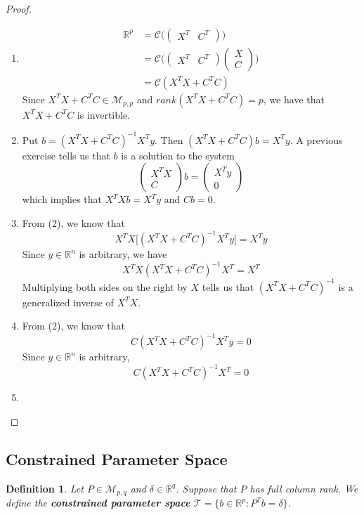 \documentclass[12pt]{amsart}
\newtheorem{defn}[thm]{Definition}
\newcommand{\del}{\delta}
\newcommand{\R}{\mathbb{R}}
\newcommand{\MC}{\mathcal{C}}
\newcommand{\MT}{\mathcal{T}}
\newcommand{\MM}{\mathcal{M}}
\begin{document}
\begin{proof}\
\begin{enumerate}
\item \begin{align*}
\R^p 
&= \MC\big(\begin{pmatrix}
X^T & C^T
\end{pmatrix}\big) \\
&= \MC\bigg(\begin{pmatrix}
X^T & C^T
\end{pmatrix} \begin{pmatrix}
X \\ C
\end{pmatrix}\bigg) \\
&= \MC(X^TX + C^TC)
\end{align*}
Since $X^TX + C^TC \in \MM_{p,p}$ and $rank(X^TX + C^TC) = p$, we have that $X^TX + C^TC$ is invertible.
\item Put $b = (X^TX +C^TC)^{-1}X^Ty$. Then $(X^TX +C^TC)b = X^Ty$. A previous exercise tells us that $b$ is a solution to the system $$\begin{pmatrix}
X^TX \\
C
\end{pmatrix} b = 
\begin{pmatrix}
X^Ty \\
0
\end{pmatrix} $$ which implies that $X^TXb = X^Ty$ and $Cb=0$.
\item From (2), we know that $$X^TX\big[ (X^TX +C^TC)^{-1}X^Ty\big] = X^Ty$$ Since $y \in \R^n$ is arbitrary, we have $$X^TX(X^TX +C^TC)^{-1}X^T = X^T$$ Multiplying both sides on the right by $X$ tells us that $(X^TX +C^TC)^{-1}$ is a generalized inverse of $X^TX$. 
\item From (2), we know that $$C(X^TX +C^TC)^{-1}X^Ty = 0$$ Since $y \in \R^n$ is arbitrary, $$C(X^TX +C^TC)^{-1}X^T = 0$$ 
\item 
\end{enumerate}
\end{proof}

\subsection{Constrained Parameter Space}

\begin{defn}
Let $P \in \MM_{p, q}$ and $\del \in \R^q$. Suppose that $P$ has full column rank. We define the \textbf{constrained parameter space} $\MT = \{b \in \R^p: P^Tb = \del\}$.
\end{defn}
\end{document}
